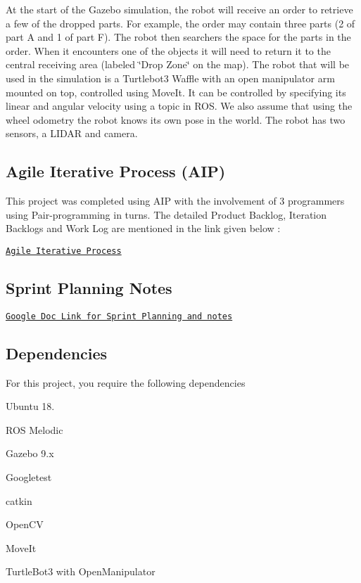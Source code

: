 At the start of the Gazebo simulation, the robot will receive an order to retrieve a few of the dropped parts. For example, the order may contain three parts (2 of part A and 1 of part F). The robot then searchers the space for the parts in the order. When it encounters one of the objects it will need to return it to the central receiving area (labeled \char`\"{}\+Drop Zone\char`\"{} on the map). The robot that will be used in the simulation is a Turtlebot3 Waffle with an open manipulator arm mounted on top, controlled using Move\+It. It can be controlled by specifying its linear and angular velocity using a topic in R\+OS. We also assume that using the wheel odometry the robot knows its own pose in the world. The robot has two sensors, a L\+I\+D\+AR and camera.



\subsection*{Agile Iterative Process (A\+IP)}

This project was completed using A\+IP with the involvement of 3 programmers using Pair-\/programming in turns. The detailed Product Backlog, Iteration Backlogs and Work Log are mentioned in the link given below \+:

\href{https://drive.google.com/file/d/1BNjG2if9-G0QJx6BSb_-JIIgaOwBue7m/view?usp=sharing}{\tt Agile Iterative Process}

\subsection*{Sprint Planning Notes}

\href{https://docs.google.com/document/d/1bBEri2t5gSxDZ9FnP-1Wu5RdeCvGUPCNcdnWPu9Y4Dw/edit?usp=sharing}{\tt Google Doc Link for Sprint Planning and notes}

\subsection*{Dependencies}

For this project, you require the following dependencies


\begin{DoxyItemize}
\item Ubuntu 18.
\item R\+OS Melodic
\item Gazebo 9.\+x
\item Googletest
\item catkin
\item Open\+CV
\item Move\+It
\item Turtle\+Bot3 with Open\+Manipulator
\end{DoxyItemize}

